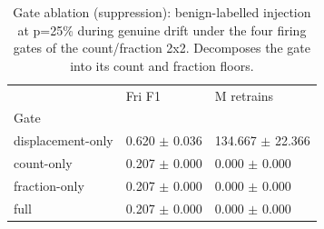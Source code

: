 \begin{table}
\caption{Gate ablation (suppression): benign-labelled injection at p=25\% during genuine drift under the four firing gates of the count/fraction 2x2. Decomposes the gate into its count and fraction floors.}
\label{tab:rq3-gate-suppression}
\begin{tabular}{lll}
\toprule
 & Fri F1 & M retrains \\
Gate &  &  \\
\midrule
displacement-only & 0.620 $\pm$ 0.036 & 134.667 $\pm$ 22.366 \\
count-only & 0.207 $\pm$ 0.000 & 0.000 $\pm$ 0.000 \\
fraction-only & 0.207 $\pm$ 0.000 & 0.000 $\pm$ 0.000 \\
full & 0.207 $\pm$ 0.000 & 0.000 $\pm$ 0.000 \\
\bottomrule
\end{tabular}
\end{table}
